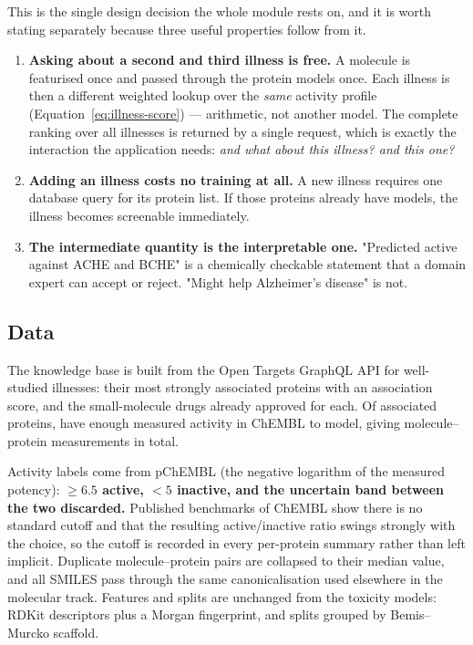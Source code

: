 This is the single design decision the whole module rests on, and it is worth stating separately
because three useful properties follow from it.

\begin{enumerate}
  \item \textbf{Asking about a second and third illness is free.} A molecule is featurised once
    and passed through the \TgtNModels{} protein models once. Each illness is then a different
    weighted lookup over the \emph{same} activity profile (Equation~\ref{eq:illness-score})
    --- arithmetic, not another model. The
    complete ranking over all \TgtNDiseases{} illnesses is returned by a single request, which is
    exactly the interaction the application needs: \emph{and what about this illness? and this
    one?}
  \item \textbf{Adding an illness costs no training at all.} A new illness requires one database
    query for its protein list. If those proteins already have models, the illness becomes
    screenable immediately.
  \item \textbf{The intermediate quantity is the interpretable one.} "Predicted active against
    ACHE and BCHE" is a chemically checkable statement that a domain expert can accept or reject.
    "Might help Alzheimer's disease" is not.
\end{enumerate}

\subsection{Data}

The knowledge base is built from the Open Targets GraphQL API for \TgtNDiseases{} well-studied
illnesses: their most strongly associated proteins with an association score, and the
small-molecule drugs already approved for each. Of \TgtNProteins{} associated proteins,
\TgtNModels{} have enough measured activity in ChEMBL to model, giving \TgtNMols{}
molecule--protein measurements in total.

Activity labels come from pChEMBL (the negative logarithm of the measured potency):
\textbf{$\geq 6.5$ active, $< 5$ inactive, and the uncertain band between the two discarded.}
Published benchmarks of ChEMBL show there is no standard cutoff and that the resulting
active/inactive ratio swings strongly with the choice, so the cutoff is recorded in every
per-protein summary rather than left implicit. Duplicate molecule--protein pairs are collapsed to
their median value, and all SMILES pass through the same canonicalisation used elsewhere in the
molecular track. Features and splits are unchanged from the toxicity models: RDKit descriptors
plus a Morgan fingerprint, and splits grouped by Bemis--Murcko scaffold.

